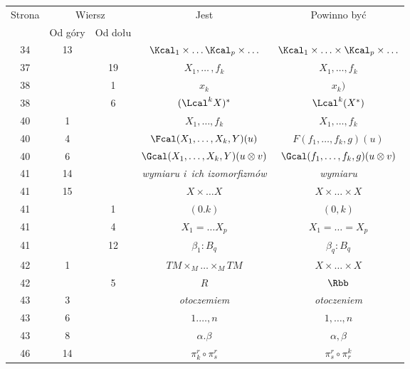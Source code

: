 \documentclass[a4paper,11pt]{article}
\numberwithin{equation}{section}
\begin{document}
\begin{center}
  \begin{tabular}{|c|c|c|c|c|}
    \hline
    Strona & \multicolumn{2}{c|}{Wiersz} & Jest
                              & Powinno być \\ \cline{2-3}
    & Od góry & Od dołu & & \\
    \hline
    34  & 13 & & $\Kcal_{ 1 } \times \ldots \Kcal_{ p } \times \ldots$
    & $\Kcal_{ 1 } \times \ldots \times \Kcal_{ p } \times \ldots$ \\
    37  & & 19 & $X_{ 1 }, \ldots\, , f_{ k }$ & $X_{ 1 }, \ldots, f_{ k }$ \\
    38  & & \hphantom{0}1 & $x_{ k }$ & $x_{ k } )$ \\
    38  & & \hphantom{0}6 & $( \Lcal^{ k } X )^{ * }$
    & $\Lcal^{ k }( X^{ * } )$ \\
    40  & \hphantom{0}1 & & $X_{ 1 }, \! \ldots, f_{ k }$
           & $X_{ 1 }, \ldots, f_{ k }$ \\
    40  & \hphantom{0}4 & & $\Fcal( X_{ 1 }, \ldots, X_{ k }, Y )( u )$
           & $F( f_{ 1 }, \ldots, f_{ k }, g )( u )$ \\
    40  & \hphantom{0}6 & & $\Gcal( X_{ 1 }, \ldots, X_{ k }, Y )( u \otimes v )$
           & $\Gcal( f_{ 1 }, \ldots, f_{ k }, g )( u \otimes v )$ \\
    41  & 14 & & \textit{wymiaru i~ich izomorfizmów} & \textit{wymiaru} \\
    41  & 15 & & $X \times \ldots X$ & $X \times \ldots \times X$ \\
    41  & & \hphantom{0}1 & $( 0. k )$ & $( 0, k )$ \\
    41  & & \hphantom{0}4 & $X_{ 1 } = \ldots X_{ p }$
           & $X_{ 1 } = \ldots = X_{ p }$ \\
    41  & & 12 & $\beta_{ 1 } : B_{ q }$ & $\beta_{ q } : B_{ q }$ \\
    42  & \hphantom{0}1 & & $TM \times_{ M } \ldots \times_{ M } TM$ & $X \times \ldots \times X$ \\
    42  & & \hphantom{0}5 & $R$ & $\Rbb$ \\
    43  & \hphantom{0}3 & & \textit{otoczemiem} & \textit{otoczeniem} \\
    43  & \hphantom{0}6 & & $1 . \ldots, n$ & $1, \ldots, n$ \\
    43  & \hphantom{0}8 & & $\alpha. \beta$ & $\alpha, \beta$ \\
    46  & 14 & & $\pi_{ k }^{ r } \circ \pi^{ r }_{ s }$
           & $\pi_{ s }^{ r } \circ \pi^{ k }_{ r }$ \\

\end{tabular}
\end{center}
\end{document}
